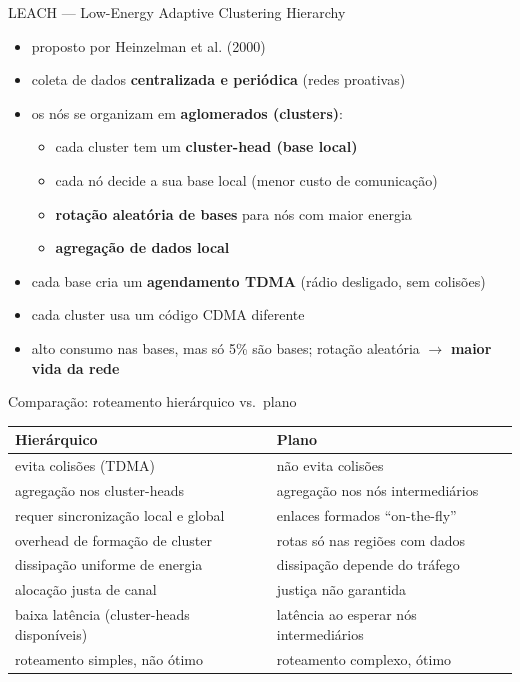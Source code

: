 \documentclass[aspectratio=169,11pt]{beamer}
\begin{document}
\begin{frame}{LEACH --- Low-Energy Adaptive Clustering Hierarchy}
  \begin{itemize}
    \item proposto por Heinzelman et al. (2000)
    \item coleta de dados \textbf{centralizada e periódica} (redes proativas)
    \item os nós se organizam em \textbf{aglomerados (clusters)}:
      \begin{itemize}
        \item cada cluster tem um \textbf{cluster-head (base local)}
        \item cada nó decide a sua base local (menor custo de comunicação)
        \item \textbf{rotação aleatória de bases} para nós com maior energia
        \item \textbf{agregação de dados local}
      \end{itemize}
    \item cada base cria um \textbf{agendamento TDMA} (rádio desligado, sem colisões)
    \item cada cluster usa um código CDMA diferente
    \item alto consumo nas bases, mas só 5\% são bases; rotação aleatória $\rightarrow$ \textbf{maior vida da rede}
  \end{itemize}
\end{frame}

\begin{frame}{Comparação: roteamento hierárquico vs.\ plano}
  \begin{center}
    \scriptsize
    \begin{tabular}{@{}p{6.4cm}p{6.4cm}@{}}
      \toprule
      \textbf{Hierárquico} & \textbf{Plano}\\
      \midrule
      evita colisões (TDMA) & não evita colisões\\
      agregação nos cluster-heads & agregação nos nós intermediários\\
      requer sincronização local e global & enlaces formados ``on-the-fly''\\
      overhead de formação de cluster & rotas só nas regiões com dados\\
      dissipação uniforme de energia & dissipação depende do tráfego\\
      alocação justa de canal & justiça não garantida\\
      baixa latência (cluster-heads disponíveis) & latência ao esperar nós intermediários\\
      roteamento simples, não ótimo & roteamento complexo, ótimo\\
      \bottomrule
    \end{tabular}
  \end{center}
\end{frame}
\end{document}
